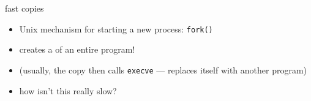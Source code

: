 
\begin{frame}{fast copies}
\begin{itemize}
    \item Unix mechanism for starting a new process: \texttt{fork()}
    \item creates a  of an entire program!
    \item (usually, the copy then calls \texttt{execve} --- replaces itself with another program)
    \vspace{.5cm}
    \item how isn't this really slow?
\end{itemize}
\end{frame}

